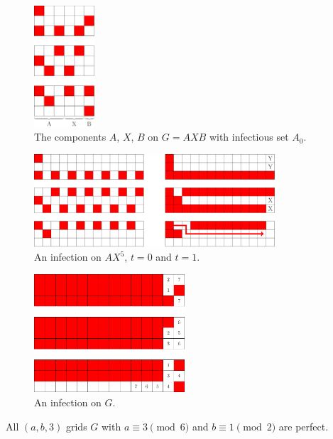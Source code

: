 \begin{figure}[]
\centering
\includegraphics[width=0.2\textwidth]{figures/7/3x6x3.pdf}
\caption{The components $A$, $X$, $B$ on $G=AXB$ with infectious set $A_0$.}
\label{fig:3x6x3}
\end{figure} 

\begin{figure}[]
\centering
\includegraphics[width=0.8\textwidth]{figures/7/3x13x3.pdf}
\caption{An infection on $AX^5$, $t=0$ and $t=1$.}
\label{fig:3x13x3}
\end{figure} 

\begin{figure}[]
\centering
\includegraphics[width=0.5\textwidth]{figures/7/3x14x3_numbered_heatmap.pdf}
\caption{An infection on $G$.}
\label{fig:3x14x3}
\end{figure} 

\begin{con}
All $(a,b,3)$ grids $G$ with $a \equiv 3 \pmod 6$ and $b \equiv 1 \pmod 2$ are perfect. 
\end{con}

